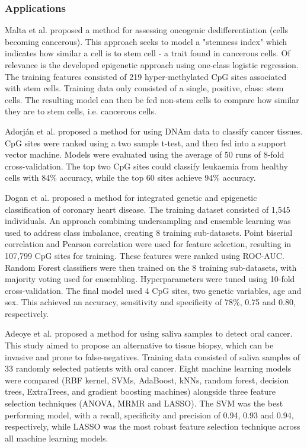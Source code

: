 \documentclass[draft]{article} %
\begin{document}
\subsubsection{Applications} \label{sec:ml-examples}

Malta et al. \cite{malta2018machine} proposed a method for assessing oncogenic dedifferentiation (cells becoming cancerous). This approach seeks to model a "stemness index" which indicates how similar a cell is to stem cell - a trait found in cancerous cells. Of relevance is the developed epigenetic approach using one-class logistic regression. The training features consisted of 219 hyper-methylated CpG sites associated with stem cells. Training data only consisted of a single, positive, class: stem cells. The resulting model can then be fed non-stem cells to compare how similar they are to stem cells, i.e. cancerous cells.

Adorj\'an et al. \cite{adorjan2002tumour} proposed a method for using DNAm data to classify cancer tissues. CpG sites were ranked using a two sample t-test, and then fed into a support vector machine. Models were evaluated using the average of 50 runs of 8-fold cross-validation. The top two CpG sites could classify leukaemia from healthy cells with 84\% accuracy, while the top 60 sites achieve 94\% accuracy.

Dogan et al. \cite{dogan2018integrated} proposed a method for integrated genetic and epigenetic classification of coronary heart disease. The training dataset consisted of 1,545 individuals. An approach combining undersampling and ensemble learning \cite{liu2008exploratory} was used to address class imbalance, creating 8 training sub-datasets. Point biserial correlation and Pearson correlation were used for feature selection, resulting in 107,799 CpG sites for training. These features were ranked using ROC-AUC. Random Forest classifiers were then trained on the 8 training sub-datasets, with majority voting used for ensembling. Hyperparameters were tuned using 10-fold cross-validation. The final model used 4 CpG sites, two genetic variables, age and sex. This achieved an accuracy, sensitivity and specificity of 78\%, 0.75 and 0.80, respectively.

Adeoye et al. \cite{adeoye2022machine} proposed a method for using saliva samples to detect oral cancer. This study aimed to propose an alternative to tissue biopsy, which can be invasive and prone to false-negatives. Training data consisted of saliva samples of 33 randomly selected patients with oral cancer. Eight machine learning models were compared (RBF kernel, SVMs, AdaBoost, kNNs, random forest, decision trees, ExtraTrees, and gradient boosting machines) alongside three feature selection techniques (ANOVA, MRMR and LASSO). The SVM was the best performing model, with a recall, specificity and precision of 0.94, 0.93 and 0.94, respectively, while LASSO was the most robust feature selection technique across all machine learning models.
\end{document}
